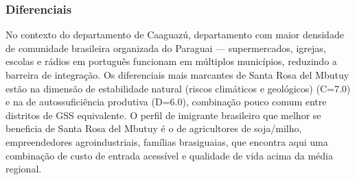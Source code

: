 \subsubsection*{Diferenciais}\label{dif-santa-rosa-del-mbutuy-0505}
No contexto do departamento de Caaguazú, departamento com maior densidade de comunidade brasileira organizada do Paraguai — supermercados, igrejas, escolas e rádios em português funcionam em múltiplos municípios, reduzindo a barreira de integração. Os diferenciais mais marcantes de Santa Rosa del Mbutuy estão na dimensão de estabilidade natural (riscos climáticos e geológicos) (C=7.0) e na de autossuficiência produtiva (D=6.0), combinação pouco comum entre distritos de GSS equivalente. O perfil de imigrante brasileiro que melhor se beneficia de Santa Rosa del Mbutuy é o de agricultores de soja/milho, empreendedores agroindustriais, famílias brasiguaias, que encontra aqui uma combinação de custo de entrada acessível e qualidade de vida acima da média regional.
